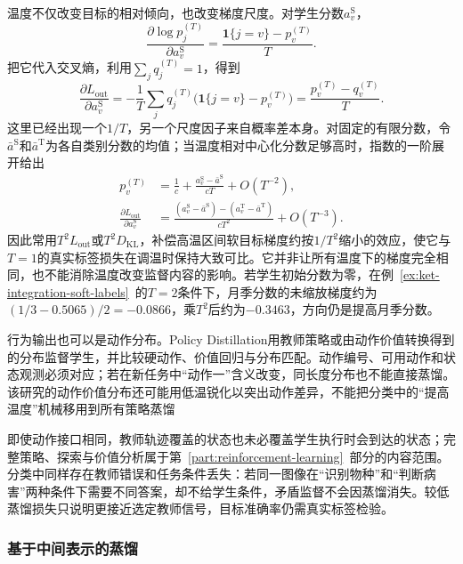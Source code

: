 温度不仅改变目标的相对倾向，也改变梯度尺度。对学生分数$a_v^{\mathrm{S}}$，
\[
  \frac{\partial\log p_j^{(T)}}{\partial a_v^{\mathrm{S}}}
    =\frac{\mathbf{1}\{j=v\}-p_v^{(T)}}{T}.
\]
把它代入交叉熵，利用$\sum_jq_j^{(T)}=1$，得到
\begin{equation}
  \frac{\partial L_{\mathrm{out}}}{\partial a_v^{\mathrm{S}}}
   =-\frac{1}{T}\sum_jq_j^{(T)}
      \bigl(\mathbf{1}\{j=v\}-p_v^{(T)}\bigr)
   =\frac{p_v^{(T)}-q_v^{(T)}}{T}.
  \label{eq:ket-integration-temperature-gradient}
\end{equation}
这里已经出现一个$1/T$，另一个尺度因子来自概率差本身。对固定的有限分数，令$\bar a^{\mathrm{S}}$和$\bar a^{\mathrm{T}}$为各自类别分数的均值；当温度相对中心化分数足够高时，指数的一阶展开给出
\begin{equation}
  \begin{aligned}
    p_v^{(T)}
      &=\frac{1}{c}+\frac{a_v^{\mathrm{S}}-\bar a^{\mathrm{S}}}{cT}
          +O(T^{-2}),\\
    \frac{\partial L_{\mathrm{out}}}{\partial a_v^{\mathrm{S}}}
      &=\frac{(a_v^{\mathrm{S}}-\bar a^{\mathrm{S}})
              -(a_v^{\mathrm{T}}-\bar a^{\mathrm{T}})}
              {cT^2}+O(T^{-3}).
  \end{aligned}
  \label{eq:ket-integration-temperature-square}
\end{equation}
因此常用$T^2L_{\mathrm{out}}$或$T^2D_{\mathrm{KL}}$，补偿高温区间软目标梯度约按$1/T^2$缩小的效应，使它与$T=1$的真实标签损失在调温时保持大致可比。它并非让所有温度下的梯度完全相同，也不能消除温度改变监督内容的影响。若学生初始分数为零，在例~\ref{ex:ket-integration-soft-labels}~的$T=2$条件下，月季分数的未缩放梯度约为$(1/3-0.5065)/2=-0.0866$，乘$T^2$后约为$-0.3463$，方向仍是提高月季分数。

行为输出也可以是动作分布。Policy Distillation用教师策略或由动作价值转换得到的分布监督学生，并比较硬动作、价值回归与分布匹配。动作编号、可用动作和状态观测必须对应；若在新任务中“动作一”含义改变，同长度分布也不能直接蒸馏。该研究的动作价值分布还可能用低温锐化以突出动作差异，不能把分类中的“提高温度”机械移用到所有策略蒸馏

即使动作接口相同，教师轨迹覆盖的状态也未必覆盖学生执行时会到达的状态；完整策略、探索与价值分析属于第~\ref{part:reinforcement-learning}~部分的内容范围。分类中同样存在教师错误和任务条件丢失：若同一图像在“识别物种”和“判断病害”两种条件下需要不同答案，却不给学生条件，矛盾监督不会因蒸馏消失。较低蒸馏损失只说明更接近选定教师信号，目标准确率仍需真实标签检验。

\subsubsection{基于中间表示的蒸馏}
\label{sec:ket-integration-feature-distillation}

